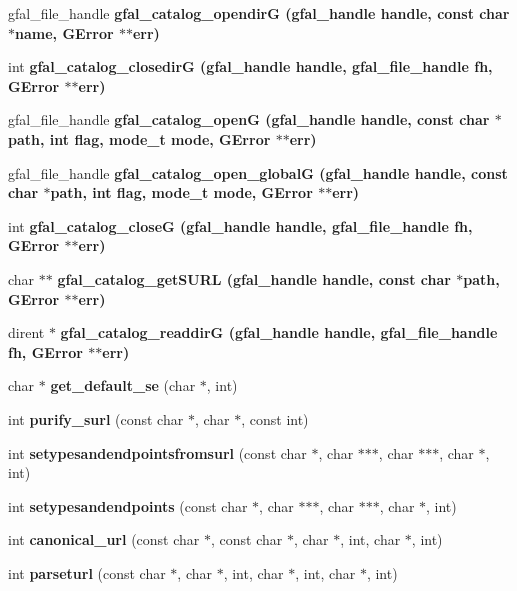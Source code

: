 \begin{CompactItemize}
\item 
gfal\_\-file\_\-handle \bf{gfal\_\-catalog\_\-opendir\-G} (gfal\_\-handle handle, const char $\ast$name, GError $\ast$$\ast$err)
\item 
int \bf{gfal\_\-catalog\_\-closedir\-G} (gfal\_\-handle handle, gfal\_\-file\_\-handle fh, GError $\ast$$\ast$err)
\item 
gfal\_\-file\_\-handle \bf{gfal\_\-catalog\_\-open\-G} (gfal\_\-handle handle, const char $\ast$path, int flag, mode\_\-t mode, GError $\ast$$\ast$err)
\item 
gfal\_\-file\_\-handle \bf{gfal\_\-catalog\_\-open\_\-global\-G} (gfal\_\-handle handle, const char $\ast$path, int flag, mode\_\-t mode, GError $\ast$$\ast$err)
\item 
int \bf{gfal\_\-catalog\_\-close\-G} (gfal\_\-handle handle, gfal\_\-file\_\-handle fh, GError $\ast$$\ast$err)
\item 
char $\ast$$\ast$ \bf{gfal\_\-catalog\_\-get\-SURL} (gfal\_\-handle handle, const char $\ast$path, GError $\ast$$\ast$err)
\item 
dirent $\ast$ \bf{gfal\_\-catalog\_\-readdir\-G} (gfal\_\-handle handle, gfal\_\-file\_\-handle fh, GError $\ast$$\ast$err)
\item 
char $\ast$ \textbf{get\_\-default\_\-se} (char $\ast$, int)\label{gfal__common__catalog_8h_c304a754c49bedeec6c1c9b1445b937d}

\item 
int \textbf{purify\_\-surl} (const char $\ast$, char $\ast$, const int)\label{gfal__common__catalog_8h_c25d6ed82e636c14d640318a2ad5f3b5}

\item 
int \textbf{setypesandendpointsfromsurl} (const char $\ast$, char $\ast$$\ast$$\ast$, char $\ast$$\ast$$\ast$, char $\ast$, int)\label{gfal__common__catalog_8h_f398c539d03eaea6dcb6b45067cb21f2}

\item 
int \textbf{setypesandendpoints} (const char $\ast$, char $\ast$$\ast$$\ast$, char $\ast$$\ast$$\ast$, char $\ast$, int)\label{gfal__common__catalog_8h_f06de10d100ffd8ad880619661708810}

\item 
int \textbf{canonical\_\-url} (const char $\ast$, const char $\ast$, char $\ast$, int, char $\ast$, int)\label{gfal__common__catalog_8h_845c890f2d493921bd587158fab72d65}

\item 
int \textbf{parseturl} (const char $\ast$, char $\ast$, int, char $\ast$, int, char $\ast$, int)\label{gfal__common__catalog_8h_70868bce152313f31e24982453f10723}


\end{CompactItemize}
